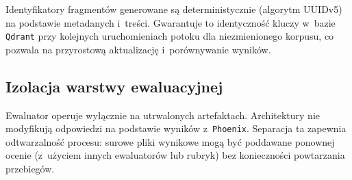 Identyfikatory fragmentów generowane są deterministycznie (algorytm UUIDv5) na
podstawie metadanych i~treści. Gwarantuje to identyczność kluczy w~bazie
\texttt{Qdrant} przy kolejnych uruchomieniach potoku dla niezmienionego
korpusu, co pozwala na przyrostową aktualizację i~porównywanie wyników.

\subsection{Izolacja warstwy ewaluacyjnej}\label{subsec:oddzielenie-ewaluacji-od-wykonania}

Ewaluator operuje wyłącznie na utrwalonych artefaktach. Architektury nie
modyfikują odpowiedzi na podstawie wyników z~\texttt{Phoenix}. Separacja ta
zapewnia odtwarzalność procesu: surowe pliki wynikowe mogą być poddawane
ponownej ocenie (z~użyciem innych ewaluatorów lub rubryk) bez konieczności
powtarzania przebiegów.